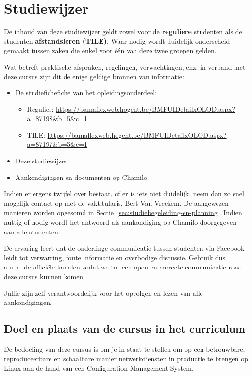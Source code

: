 \chapter{Studiewijzer}
\label{ch:studiewijzer}

De inhoud van deze studiewijzer geldt zowel voor de \textbf{reguliere} studenten als de studenten \textbf{afstandsleren (TILE)}. Waar nodig wordt duidelijk onderscheid gemaakt tussen zaken die enkel voor één van deze twee groepen gelden.

Wat betreft praktische afspraken, regelingen, verwachtingen, enz. in
verband met deze cursus zijn dit de enige geldige bronnen van
informatie:

\begin{itemize}
  \item De studiefichefiche van het opleidingsonderdeel:
  \begin{itemize}
    \item Regulier: \url{https://bamaflexweb.hogent.be/BMFUIDetailxOLOD.aspx?a=87198&b=5&c=1}
    \item TILE: \url{https://bamaflexweb.hogent.be/BMFUIDetailxOLOD.aspx?a=87197&b=5&c=1}
  \end{itemize}
  \item Deze studiewijzer
  \item Aankondigingen en documenten op Chamilo
\end{itemize}

Indien er ergens twijfel over bestaat, of er is iets niet duidelijk, neem dan zo snel mogelijk contact op met de vaktitularis, Bert Van Vreckem. De aangewezen manieren worden opgesomd in Sectie~\ref{sec:studiebegeleiding-en-planning}. Indien nuttig of nodig wordt het antwoord als aankondiging op Chamilo doorgegeven aan alle studenten.

De ervaring leert dat de onderlinge communicatie tussen studenten via Facebook leidt tot verwarring, foute informatie en overbodige discussie. Gebruik dus a.u.b.~de officiële kanalen zodat we tot een open en correcte communicatie rond deze cursus kunnen komen.

Jullie zijn zelf verantwoordelijk voor het opvolgen en lezen van alle aankondigingen.

\section{Doel en plaats van de cursus in het curriculum}
\label{sec:doel-en-plaats}

De bedoeling van deze cursus is om je in staat te stellen om op een betrouwbare, reproduceerbare en schaalbare manier netwerkdiensten in productie te brengen op Linux aan de hand van een Configuration Management System.

